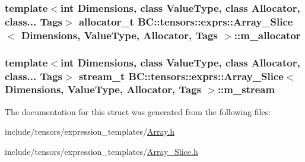 \subsubsection[{\texorpdfstring{m\+\_\+allocator}{m_allocator}}]{\setlength{\rightskip}{0pt plus 5cm}template$<$int Dimensions, class Value\+Type, class Allocator, class... Tags$>$ {\bf allocator\+\_\+t} {\bf B\+C\+::tensors\+::exprs\+::\+Array\+\_\+\+Slice}$<$ Dimensions, Value\+Type, {\bf Allocator}, Tags $>$\+::m\+\_\+allocator}\hypertarget{classBC_1_1tensors_1_1exprs_1_1Array__Slice_aa7dc5cd48d47896f87e7df27671d74b7}{}\label{classBC_1_1tensors_1_1exprs_1_1Array__Slice_aa7dc5cd48d47896f87e7df27671d74b7}
\subsubsection[{\texorpdfstring{m\+\_\+stream}{m_stream}}]{\setlength{\rightskip}{0pt plus 5cm}template$<$int Dimensions, class Value\+Type, class Allocator, class... Tags$>$ {\bf stream\+\_\+t} {\bf B\+C\+::tensors\+::exprs\+::\+Array\+\_\+\+Slice}$<$ Dimensions, Value\+Type, {\bf Allocator}, Tags $>$\+::m\+\_\+stream}\hypertarget{classBC_1_1tensors_1_1exprs_1_1Array__Slice_a88f9bafcc2e18f45ae9217d1f37215df}{}\label{classBC_1_1tensors_1_1exprs_1_1Array__Slice_a88f9bafcc2e18f45ae9217d1f37215df}


The documentation for this struct was generated from the following files\+:\begin{DoxyCompactItemize}
\item 
include/tensors/expression\+\_\+templates/\hyperlink{Array_8h}{Array.\+h}\item 
include/tensors/expression\+\_\+templates/\hyperlink{Array__Slice_8h}{Array\+\_\+\+Slice.\+h}\end{DoxyCompactItemize}
